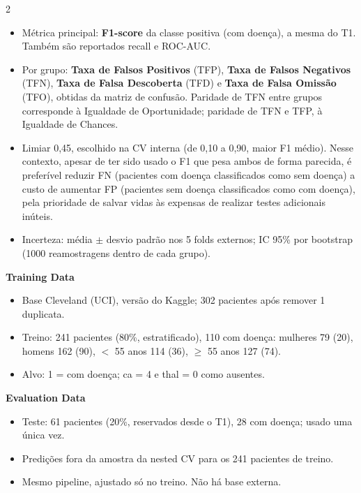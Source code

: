 \documentclass[10pt,a4paper]{article}
\newcommand{\secao}[1]{\par\vspace{5pt}{\normalsize\bfseries #1}\par\vspace{1pt}}
\begin{document}
\begin{paracol}{2}
\secao{Metrics}
\begin{itemize}
\item Métrica principal: \textbf{F1-score} da classe positiva (com doença), a mesma do T1. Também são reportados recall e ROC-AUC.
\item Por grupo: \textbf{Taxa de Falsos Positivos} (TFP), \textbf{Taxa de Falsos Negativos} (TFN), \textbf{Taxa de Falsa Descoberta} (TFD) e \textbf{Taxa de Falsa Omissão} (TFO), obtidas da matriz de confusão. Paridade de TFN entre grupos corresponde à Igualdade de Oportunidade; paridade de TFN e TFP, à Igualdade de Chances.
\item Limiar 0,45, escolhido na CV interna (de 0,10 a 0,90, maior F1 médio). Nesse contexto, apesar de ter sido usado o F1 que pesa ambos de forma parecida, é preferível reduzir FN (pacientes com doença classificados como sem doença) a custo de aumentar FP (pacientes sem doença classificados como com doença), pela prioridade de salvar vidas às expensas de realizar testes adicionais inúteis.
\item Incerteza: média $\pm$ desvio padrão nos 5 folds externos; IC 95\% por bootstrap (1000 reamostragens dentro de cada grupo).
\end{itemize}

\vspace{4pt}
\begin{minipage}[t]{0.485\linewidth}
{\normalsize\bfseries Training Data}\par\vspace{1pt}
\begin{itemize}
\item Base Cleveland (UCI), versão do Kaggle; 302 pacientes após remover 1 duplicata.
\item Treino: 241 pacientes (80\%, estratificado), 110 com doença: mulheres 79 (20), homens 162 (90), $<$ 55 anos 114 (36), $\geq$ 55 anos 127 (74).
\item Alvo: 1 = com doença; ca = 4 e thal = 0 como ausentes.
\end{itemize}
\end{minipage}\hfill
\begin{minipage}[t]{0.485\linewidth}
{\normalsize\bfseries Evaluation Data}\par\vspace{1pt}
\begin{itemize}
\item Teste: 61 pacientes (20\%, reservados desde o T1), 28 com doença; usado uma única vez.
\item Predições fora da amostra da nested CV para os 241 pacientes de treino.
\item Mesmo pipeline, ajustado só no treino. Não há base externa.
\end{itemize}
\end{minipage}


\end{paracol}
\end{document}
